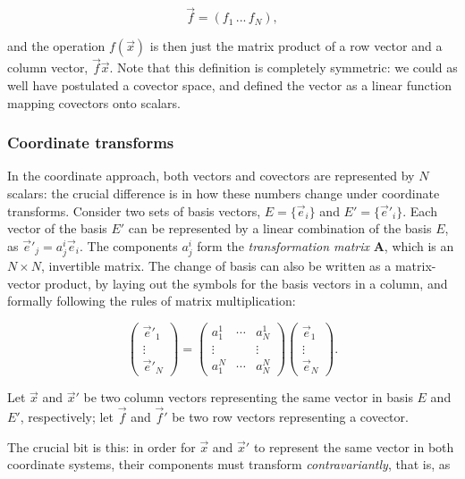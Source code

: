 \documentclass[]{aa}
\begin{document}
\[
\vec f = \left( f_1 \, ... \, f_N \right), 
\]

and the operation $f(\vec x)$ is then just the matrix product of a row vector and a column vector, $\vec f\vec x$. Note that this definition is completely symmetric: we could as well have postulated a covector space, and defined the vector as a linear function mapping covectors onto scalars.

\subsubsection{Coordinate transforms}
\label{sec:coordinatre-xforms}

In the coordinate approach, both vectors and covectors are represented by $N$ scalars: the crucial difference is in how these numbers change under coordinate transforms. Consider two sets of basis vectors, $E=\{\vec e_i\}$ and $E'=\{\vec e'_i\}$. Each vector of the basis $E'$ can be represented by a linear combination of the basis $E$, as $\vec e'_j = a^i_j \vec e_i$. The components $a^i_j$ form the {\em transformation matrix} $\mathbf{A}$, which is an $N\times N$, invertible matrix. The change of basis can also be written as a matrix-vector product, by laying out the symbols for the basis vectors in a column, and formally following the rules of matrix multiplication:

\[
    \left( \begin{array}{c} \vec e'_1 \\ \vdots \\ \vec e'_N \end{array} \right ) = 
    \left( \begin{array}{ccc} 
      a^1_1 & \cdots & a^1_N \\
      \vdots & & \vdots \\
      a^N_1 & \cdots & a^N_N 
    \end{array} \right )  
    \left( \begin{array}{c} \vec e_1 \\ \vdots \\ \vec e_N \end{array}  \right ).
\]



Let $\vec x$ and $\vec x'$ be two column vectors representing the same vector in basis $E$ and $E'$, respectively; let $\vec f$ and $\vec f'$ be two row vectors representing a covector.

The crucial bit is this: in order for $\vec x$ and $\vec x'$ to represent the same vector in both coordinate systems, their components must transform \emph{contravariantly}, that is, as
\end{document}

